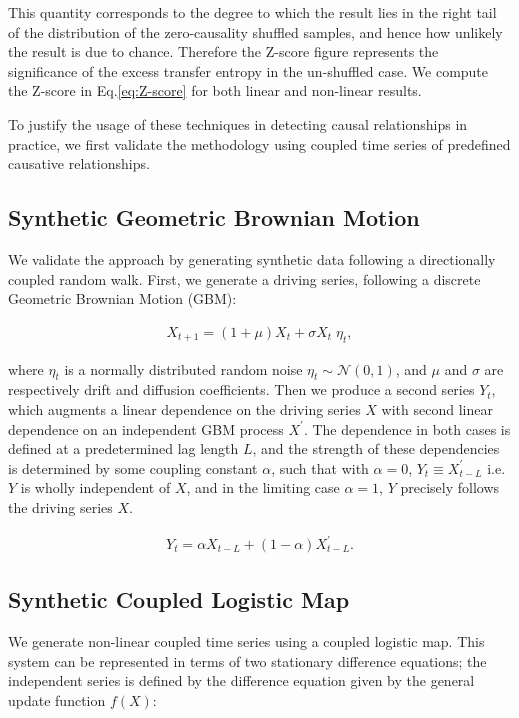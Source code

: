 \documentclass[]{rsos}%
\begin{document}
  This quantity corresponds to the degree to which the result lies in the right tail of the distribution of the zero-causality shuffled samples, and hence how unlikely the result is due to chance. Therefore the Z-score figure represents the significance of the excess transfer entropy in the un-shuffled case. We compute the Z-score in Eq.\ref{eq:Z-score} for both linear and non-linear results.


  To justify the usage of these techniques in detecting causal relationships in practice, we first validate the methodology using coupled time series of predefined causative relationships. 


  \subsection{Synthetic Geometric Brownian Motion}\label{s.LinearSignal}
  We validate the approach by generating synthetic data following a directionally coupled random walk. First, we generate a driving series, following a discrete Geometric Brownian Motion (GBM):

  \begin{eqnarray}
      \label{eq:GBM}
      X_{t+1} = (1+\mu) X_t + \sigma X_t \; \eta_t ,
  \end{eqnarray}

  where $\eta_t$ is a normally distributed random noise  $\eta_t \sim \mathcal{N}(0,1)$, and $\mu$ and $\sigma$ are respectively drift and diffusion coefficients. Then we produce a second series $Y_t$, which augments a linear dependence on the driving series $X$ with second linear dependence on an independent GBM process $X^{\prime}$. The dependence in both cases is defined at a predetermined lag length $L$, and the strength of these dependencies is determined by some coupling constant $\alpha$, such that with $\alpha=0$, $Y_{t} \equiv X^{\prime}_{t-L}$ i.e. $Y$ is wholly independent of $X$, and in the limiting case $\alpha=1$, $Y$ precisely follows the driving series $X$.

  \begin{eqnarray}
    \label{eq:coupled_random_walk}
    Y_{t} =  \alpha X_{t-L} + (1-\alpha) X^{\prime}_{t-L} .
  \end{eqnarray}

  

  \subsection{Synthetic Coupled Logistic Map}\label{s.NonLinearSignal}
  We generate non-linear coupled time series using a coupled logistic map. This system can be represented in terms of two stationary difference equations; the independent series is defined by the difference equation given by the general update function $f(X)$:
\end{document}
